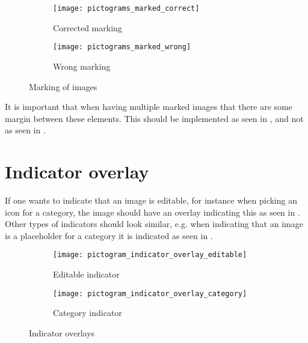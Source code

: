 \begin{figure}[!htbp]
    \centering

    \begin{subfigure}[t]{0.4\textwidth}
    	\centering
        \texttt{[image: pictograms\_marked\_correct]}
        \caption{Corrected marking}
        \label{fig:pictograms_marked_corect}
    \end{subfigure}
    \hspace{5em} 
    \begin{subfigure}[t]{0.4\textwidth}
    	\centering
        \texttt{[image: pictograms\_marked\_wrong]}
        \caption{Wrong marking}
        \label{fig:pictograms_marked_wrong}
    \end{subfigure}
    
    \caption{Marking of images}
    \label{fig:pictograms_marked}
\end{figure}

\begin{note}
	It is important that when having multiple marked images that there are some margin between these elements. This should be implemented as seen in , and not as seen in .
\end{note} 

\section{Indicator overlay}
\label{sec:indicator_overlay}

If one wants to indicate that an image is editable, for instance when picking an icon for a category, the image should have an overlay indicating this as seen in . Other types of indicators should look similar, e.g. when indicating that an image is a placeholder for a category it is indicated as seen in .

\begin{figure}[!htbp]
    \centering

    \begin{subfigure}[t]{0.4\textwidth}
        \centering
        \texttt{[image: pictogram\_indicator\_overlay\_editable]}
        \caption{Editable indicator}
        \label{fig:pictogram_indicator_overlay_editable}
    \end{subfigure}
    \hspace{5em} 
    \begin{subfigure}[t]{0.4\textwidth}
        \centering
        \texttt{[image: pictogram\_indicator\_overlay\_category]}
        \caption{Category indicator}
        \label{fig:pictogram_indicator_overlay_category}
    \end{subfigure}
    
    \caption{Indicator overlays}
    \label{fig:pictograms_marked}
\end{figure}

